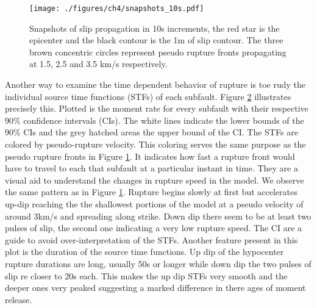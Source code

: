 \begin{figure}[!ht] 
  \centering
  \texttt{[image: ./figures/ch4/snapshots\_10s.pdf]}
    \caption[Model snapshots]{Snapshots of slip propagation in 10s increments, the red star is the epicenter and the black contour is the 1m of slip contour. The three brown concentric circles represent pseudo rupture fronts propagating at 1.5, 2.5 and 3.5 km/s respectively.}
  \label{fig_snapshots}
\end{figure}

Another way to examine the time dependent behavior of rupture is toe rudy the individual source time functions (STFs) of each subfault. Figure \ref{fig_tiles} illustrates precisely this. Plotted is the moment rate for every subfault with their respective 90\% confidence intervals (CIs). The white lines indicate the lower bounds of the 90\% CIs and the grey hatched areas the upper bound of the CI. The STFs are colored by pseudo-rupture velocity. This coloring serves the same purpose as the pseudo rupture fronts in Figure \ref{fig_snapshots}. It indicates how fast a rupture front would have to travel to each that subfault at a particular instant in time. They are a visual aid to understand the changes in rupture speed in the model. We observe the same pattern as in Figure \ref{fig_snapshots}. Rupture begins slowly at first but accelerates up-dip reaching the the shallowest portions of the model at a pseudo velocity of around 3km/s and spreading along strike. Down dip there seem to be at least two pulses of slip, the second one indicating a very low rupture speed. The CI are a guide to avoid over-interpretation of the STFs. Another feature present in this plot is the duration of the source time functions. Up dip of the hypocenter rupture durations are long, usually 50s or longer while down dip the two pulses of slip re closer to 20s each. This makes the up dip STFs very smooth and the deeper ones very peaked suggesting a marked difference in there ages of moment release.

\begin{figure}[ht]
  \label{fig_tiles}
\end{figure}

